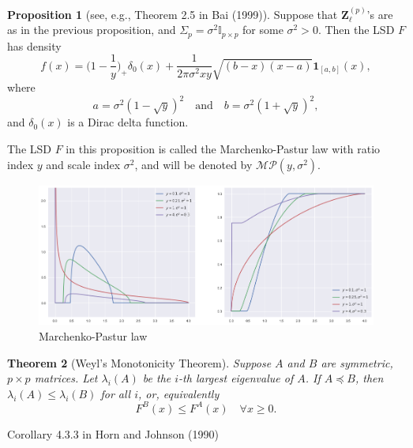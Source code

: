 \documentclass[a4paper,11pt]{article}
\theoremstyle{plain}
\newtheorem{thm}{Theorem}
\theoremstyle{definition}
\newtheorem{prps}[thm]{Proposition}
\renewenvironment{proof}{{\scshape Proof:}}{}
\begin{document}
	\begin{prps}[see, e.g., Theorem 2.5 in Bai (1999)]
		Suppose that $\mathbf{Z}_\ell^{(p)}$'s are as in the previous proposition, and $\Sigma_p = \sigma^2 \mathbb{I}_{p \times p}$ for some $\sigma^2>0$. Then the LSD $F$ has density
		\[ f(x) = \Big(1-\frac{1}{y}\Big)_+\delta_0(x) + \frac{1}{2 \pi \sigma^2 xy} \sqrt{(b-x)(x-a)} \mathbf{1}_{[a,b]}(x), \]
		where 
		\[ a = \sigma^2(1-\sqrt{y})^2 \quad \text{and} \quad b = \sigma^2(1+\sqrt{y})^2, \]
		and $\delta_0(x)$ is a Dirac delta function.
	\end{prps}
	The LSD $F$ in this proposition is called the Marchenko-Pastur law with ratio index $y$ and scale index $\sigma^2$, and will be denoted by $\mathcal{MP}(y, \sigma^2)$.
	\begin{figure}
		\begin{center} \centering
			\includegraphics[scale=0.4]{MP}
			\caption{Marchenko-Pastur law}
		\end{center}
	\end{figure}
	
	
	\begin{thm}[Weyl's Monotonicity Theorem]
		Suppose $A$ and $B$ are symmetric, $p \times p$ matrices. Let $\lambda_i(A)$ be the $i$-th largest eigenvalue of $A$. If $A \preceq B$, then $\lambda_i(A) \leq \lambda_i(B)$ for all $i$, or, equivalently
		\[ F^B(x) \leq F^A(x) \quad \forall x \geq 0. \]
    \end{thm}
    \begin{proof}
    	Corollary 4.3.3 in Horn and Johnson (1990)
    \end{proof}
		
\end{document}
